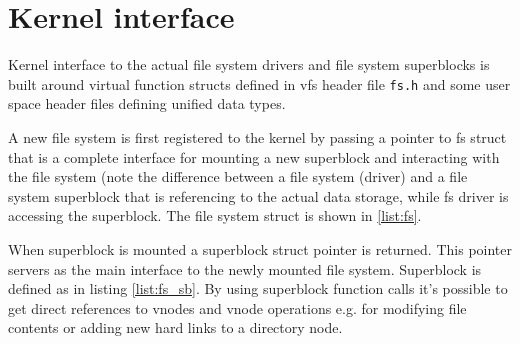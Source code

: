 \section{Kernel interface}

Kernel interface to the actual file system drivers and file system superblocks
is built around virtual function structs defined in \acs{vfs} header file
\verb+fs.h+ and some user space header files defining unified data types.

A new file system is first registered to the kernel by passing a pointer to
fs struct that is a complete interface for mounting a new superblock and
interacting with the file system (note the difference between a file system
(driver) and a file system superblock that is referencing to the actual data
storage, while fs driver is accessing the superblock. The file system struct
is shown in \ref{list:fs}.

When superblock is mounted a superblock struct pointer is returned. This pointer
servers as the main interface to the newly mounted file system. Superblock is
defined as in listing \ref{list:fs_sb}. By using superblock function calls it's
possible to get direct references to vnodes and \acs{vnode} operations e.g. for
modifying file contents or adding new hard links to a directory node.









